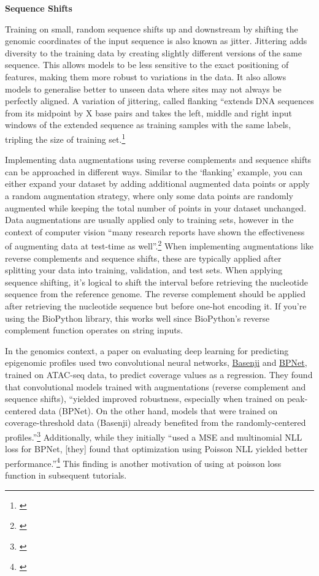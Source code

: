 \documentclass[
]{book}
\begin{document}
\textbf{Sequence Shifts}

Training on small, random sequence shifts up and downstream by shifting the genomic coordinates of the input sequence is also known as jitter. Jittering adds diversity to the training data by creating slightly different versions of the same sequence. This allows models to be less sensitive to the exact positioning of features, making them more robust to variations in the data. It also allows models to generalise better to unseen data where sites may not always be perfectly aligned. A variation of jittering, called flanking ``extends DNA sequences from its midpoint by X base pairs and takes the left, middle and right input windows of the extended sequence as training samples with the same labels, tripling the size of training set.\footnote{\citet{cao2019}}

Implementing data augmentations using reverse complements and sequence shifts can be approached in different ways. Similar to the `flanking' example, you can either expand your dataset by adding additional augmented data points or apply a random augmentation strategy, where only some data points are randomly augmented while keeping the total number of points in your dataset unchanged. Data augmentations are usually applied only to training sets, however in the context of computer vision ``many research reports have shown the effectiveness of augmenting data at test-time as well''.\footnote{\citet{connor2019}} When implementing augmentations like reverse complements and sequence shifts, these are typically applied after splitting your data into training, validation, and test sets. When applying sequence shifting, it's logical to shift the interval before retrieving the nucleotide sequence from the reference genome. The reverse complement should be applied after retrieving the nucleotide sequence but before one-hot encoding it. If you're using the BioPython library, this works well since BioPython's reverse complement function operates on string inputs.

In the genomics context, a paper on evaluating deep learning for predicting epigenomic profiles used two convolutional neural networks, \href{https://github.com/calico/basenji}{Basenji} and \href{https://github.com/kundajelab/bpnet}{BPNet}, trained on ATAC-seq data, to predict coverage values as a regression. They found that convolutional models trained with augmentations (reverse complement and sequence shifts), ``yielded improved robustness, especially when trained on peak-centered data (BPNet). On the other hand, models that were trained on coverage-threshold data (Basenji) already benefited from the randomly-centered profiles.''\footnote{\citet{toneyan2022}} Additionally, while they initially ``used a MSE and multinomial NLL loss for BPNet, {[}they{]} found that optimization using Poisson NLL yielded better performance.''\footnote{\citet{toneyan2022}} This finding is another motivation of using at poisson loss function in subsequent tutorials.
\end{document}
